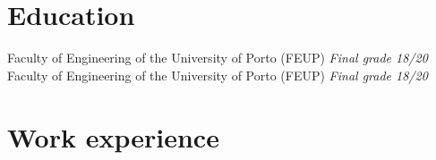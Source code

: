 \documentclass[letterpaper]{twentysecondcv} %
\begin{document}
\vfill


\section{Education}

\begin{twenty}
    {Faculty of Engineering of the University of Porto (FEUP)}
    {\emph{Final grade 18/20}}
    {Faculty of Engineering of the University of Porto (FEUP)}
    {\emph{Final grade 18/20}}
\end{twenty}

\vfill


\section{Work experience}
\end{document}
